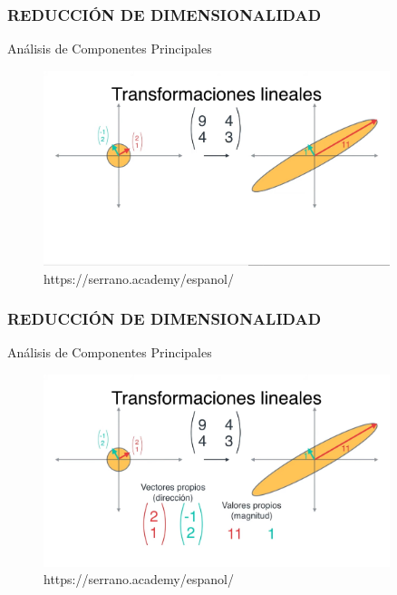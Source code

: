 \documentclass{beamer}
\begin{document}
\begin{frame}
	\frametitle{REDUCCIÓN DE DIMENSIONALIDAD}
	\begin{block}{Análisis de Componentes Principales}	
		\begin{figure}
			\includegraphics[width=0.9\textwidth]{PCA/IMG_3574.jpg}
			\caption{https://serrano.academy/espanol/}
		\end{figure}
	\end{block}
\end{frame}

\begin{frame}
	\frametitle{REDUCCIÓN DE DIMENSIONALIDAD}
	\begin{block}{Análisis de Componentes Principales}	
		\begin{figure}
			\includegraphics[width=0.9\textwidth]{PCA/IMG_3575.jpg}
			\caption{https://serrano.academy/espanol/}
		\end{figure}
	\end{block}
\end{frame}
\end{document}
